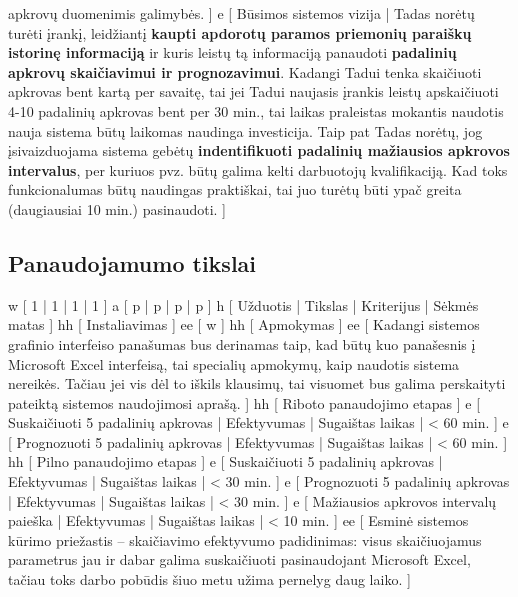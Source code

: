 {    apkrovų duomenimis galimybės.
  ]
  e [ Būsimos sistemos vizija 
  | 
    Tadas norėtų turėti įrankį, leidžiantį \textbf{kaupti apdorotų paramos priemonių paraiškų
    istorinę informaciją} ir kuris leistų tą informaciją panaudoti \textbf{padalinių apkrovų 
    skaičiavimui ir prognozavimui}.
    Kadangi Tadui tenka skaičiuoti apkrovas bent kartą per savaitę, tai jei Tadui naujasis 
    įrankis leistų apskaičiuoti 4-10 padalinių apkrovas bent per 30 min., 
    tai laikas praleistas mokantis naudotis nauja sistema būtų laikomas naudinga investicija.
    Taip pat Tadas norėtų, jog įsivaizduojama sistema gebėtų \textbf{indentifikuoti padalinių
    mažiausios apkrovos intervalus}, per kuriuos pvz. būtų galima kelti darbuotojų kvalifikaciją.
    Kad toks funkcionalumas būtų naudingas praktiškai, tai juo turėtų būti ypač greita 
    (daugiausiai 10 min.) pasinaudoti.
  ]
}

\subsection{Panaudojamumo tikslai}
\xtable
{
  w [ 1 | 1 | 1 | 1 ]
  a [ p | p | p | p ]
  h [ Užduotis | Tikslas | Kriterijus | Sėkmės matas ]
  hh [ Instaliavimas ]
  ee [ w ]
  hh [ Apmokymas ]
  ee 
  [ 
    Kadangi sistemos grafinio interfeiso panašumas bus derinamas taip, kad būtų kuo panašesnis
    į Microsoft Excel interfeisą, tai specialių apmokymų, kaip naudotis sistema nereikės. Tačiau
    jei vis dėl to iškils klausimų, tai visuomet bus galima perskaityti pateiktą sistemos naudojimosi
    aprašą. 
  ]
  hh [ Riboto panaudojimo etapas ]
  e [ Suskaičiuoti 5 padalinių apkrovas | Efektyvumas | Sugaištas laikas | < 60 min. ]
  e [ Prognozuoti 5 padalinių apkrovas | Efektyvumas | Sugaištas laikas | < 60 min. ]
  hh [ Pilno panaudojimo etapas ]
  e [ Suskaičiuoti 5 padalinių apkrovas | Efektyvumas | Sugaištas laikas | < 30 min. ]
  e [ Prognozuoti 5 padalinių apkrovas | Efektyvumas | Sugaištas laikas | < 30 min. ]
  e [ Mažiausios apkrovos intervalų paieška | Efektyvumas | Sugaištas laikas | < 10 min. ]
  ee 
  [ 
    Esminė sistemos kūrimo priežastis – skaičiavimo efektyvumo padidinimas: visus skaičiuojamus
    parametrus jau ir dabar galima suskaičiuoti pasinaudojant Microsoft Excel, tačiau toks
    darbo pobūdis šiuo metu užima pernelyg daug laiko.
  ]
}

